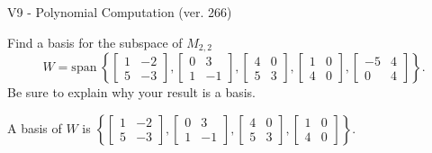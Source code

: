 \begin{exercise}
  \begin{exerciseTitle}V9 - Polynomial Computation (ver. 266)\end{exerciseTitle}
  \begin{exerciseStatement}
    Find a basis for the subspace of \(M_{2,2}\) 
\[W=\mathrm{span}\ \left\{\left[\begin{array}{cc}
1 & -2 \\
5 & -3
\end{array}\right] , \left[\begin{array}{cc}
0 & 3 \\
1 & -1
\end{array}\right] , \left[\begin{array}{cc}
4 & 0 \\
5 & 3
\end{array}\right] , \left[\begin{array}{cc}
1 & 0 \\
4 & 0
\end{array}\right] , \left[\begin{array}{cc}
-5 & 4 \\
0 & 4
\end{array}\right]\right\}.\]
 Be sure to explain why your result is a basis.


  \end{exerciseStatement}
  \begin{exerciseAnswer}
   A basis of \(W\) is  \(\left\{\left[\begin{array}{cc}
1 & -2 \\
5 & -3
\end{array}\right] , \left[\begin{array}{cc}
0 & 3 \\
1 & -1
\end{array}\right] , \left[\begin{array}{cc}
4 & 0 \\
5 & 3
\end{array}\right] , \left[\begin{array}{cc}
1 & 0 \\
4 & 0
\end{array}\right]\right\}\).
  


  \end{exerciseAnswer}
\end{exercise}